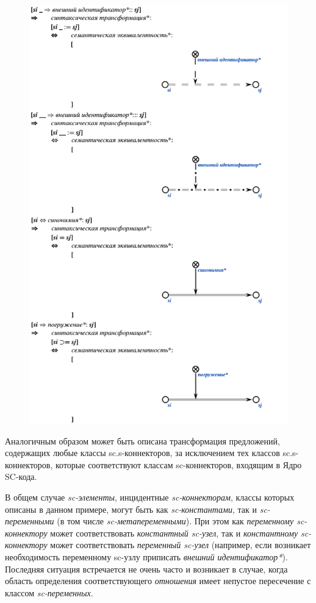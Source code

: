 \newpage
\begin{figure}[h]
	\includegraphics[scale=0.5]{images/intro/scs/sc.s-connectors/examples/example_4.png}
\end{figure}

Аналогичным образом может быть описана трансформация предложений, содержащих любые классы sc.s-коннекторов, за исключением тех классов sc.s-коннекторов, которые соответствуют классам sc-коннекторов, входящим в Ядро SC-кода.

В общем случае \textit{sc-элементы}, инцидентные \textit{sc-коннекторам}, классы которых описаны в данном примере, могут быть как \textit{sc-константами}, так и \textit{sc-переменными} (в том числе \textit{sc-метапеременными}). При этом как \textit{переменному sc-коннектору} может соответствовать \textit{константный sc-узел}, так и \textit{константному sc-коннектору} может соответствовать \textit{переменный sc-узел} (например, если возникает необходимость переменному sc-узлу приписать \textit{внешний идентификатор*}). Последняя ситуация встречается не очень часто и возникает в случае, когда область определения соответствующего \textit{отношения} имеет непустое пересечение с классом \textit{sc-переменных}.


